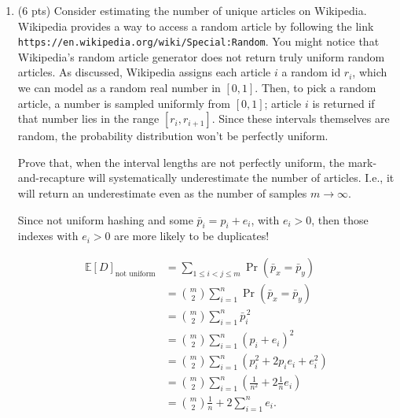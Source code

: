 \documentclass[11pt]{article}
\begin{document}
\begin{enumerate}[label=\arabic*.]
	\[
	u=\frac{t}{\sigma},\qquad t=a\mu
	\]
	\[
	u=\frac{a\mu}{\sigma}.
	\]

	\[
	\frac{a\mu}{\sigma}\ge \sqrt{10}
	\]
	\[
	\mu \ge \frac{\sqrt{10}\,\sigma}{a}.
	\]

	\[
	\binom{m}{2}\frac{1}{n}\ge \frac{\sqrt{10}\,\sigma}{a}
	\qquad\Rightarrow\qquad
	\frac{m(m-1)}{2}\ge \frac{n}{a}\,c,
	\ \ c=\sqrt{10}\,\sigma.
	\]

	\[
	m=O\!\left(\frac{\sqrt{n}}{a}\right),
	\qquad
	\text{let } a=\epsilon,
	\qquad
	\boxed{
	m=O\!\left(\frac{\sqrt{n}}{\epsilon}\right).
	}
	\]

	\item (6 pts) Consider estimating the number of unique articles on Wikipedia. Wikipedia provides a way to access a random article by following the link \texttt{https://en.wikipedia.org/wiki/Special:Random}. You might notice that Wikipedia's random article generator does not return truly uniform random articles. As discussed, Wikipedia assigns each article $i$ a random id $r_i$, which we can model as a random real number in $[0,1]$. Then, to pick a random article, a number is sampled uniformly from $[0,1]$; article $i$ is returned if that number lies in the range $[r_i, r_{i+1}]$. Since these intervals themselves are random, the probability distribution won't be perfectly uniform.

	Prove that, when the interval lengths are not perfectly uniform, the mark-and-recapture will systematically underestimate the number of articles. I.e., it will return an underestimate even as the number of samples $m\to\infty$.



\medskip

\noindent Since not uniform hashing and some $\bar{p}_i = p_i + e_i$, with $e_i>0$,
then those indexes with $e_i>0$ are more likely to be duplicates!

\begin{align*}
\mathbb{E}[D]_{\text{not uniform}}
&= \sum_{1\le i<j\le m} \Pr(\bar{p}_x=\bar{p}_y) \\
&= \binom{m}{2}\sum_{i=1}^{n}\Pr(\bar{p}_x=\bar{p}_y) \\
&= \binom{m}{2}\sum_{i=1}^{n}\bar{p}_i^{\,2} \\
&= \binom{m}{2}\sum_{i=1}^{n}(p_i+e_i)^2 \\
&= \binom{m}{2}\sum_{i=1}^{n}\left(p_i^2+2p_ie_i+e_i^2\right) \\
&= \binom{m}{2}\sum_{i=1}^{n}\left(\frac{1}{n^2}+2\frac{1}{n}e_i\right) \\
&= \binom{m}{2}\frac{1}{n} + 2\sum_{i=1}^{n} e_i .
\end{align*}


\end{enumerate}
\end{document}
